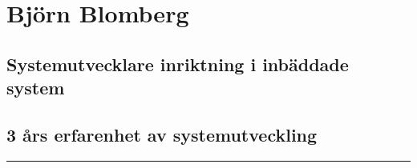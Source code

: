 \documentclass{article}
\begin{document}
\begin{minipage}[t]{0.7\textwidth}
\titleformat{\section}{\Huge\bfseries}{\thesection}{1em}{}
\section*{\textcolor{colorBlue}{Björn Blomberg}}
\subsection*{\textcolor{colorRed}{Systemutvecklare inriktning i inbäddade system}}
\subsection*{3 års erfarenhet av systemutveckling}
\rule{7cm}{0.4pt}
\titleformat{\section}{\Large\bfseries}{\thesection}{1em}{}
\vspace{1.5cm}
\end{minipage}%
\begin{minipage}[t]{0.3\textwidth}
\vspace{-10pt} %
\end{minipage}%
\end{document}
